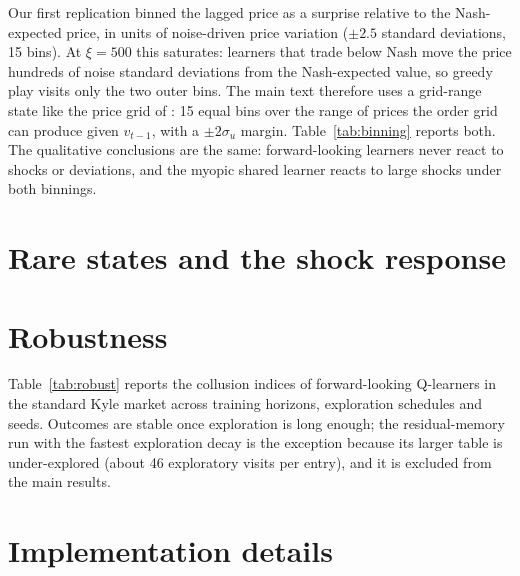 Our first replication binned the lagged price as a surprise relative to the
Nash-expected price, in units of noise-driven price variation ($\pm2.5$
standard deviations, 15 bins). At $\xi=500$ this saturates: learners that
trade below Nash move the price hundreds of noise standard deviations from the
Nash-expected value, so greedy play visits only the two outer bins. The main
text therefore uses a grid-range state like the price grid of \citet{dou2025}:
15 equal bins over the range of prices the order grid can produce given
$v_{t-1}$, with a $\pm2\sigma_u$ margin. Table~\ref{tab:binning} reports both.
The qualitative conclusions are the same: forward-looking learners never react
to shocks or deviations, and the myopic shared learner reacts to large shocks
under both binnings.

\begin{table}[h]
  \centering
  \small
  \resizebox{\linewidth}{!}{}
  \caption{$\xi=500$ results under the two price-state binnings. Shock
  response and rival reaction in \% of $\beta^N$; 95\% CIs.}
  \label{tab:binning}
\end{table}

\section{Rare states and the shock response}
\label{app:rare}


\section{Robustness}
\label{app:robust}

Table~\ref{tab:robust} reports the collusion indices of forward-looking
Q-learners in the standard Kyle market across training horizons, exploration
schedules and seeds. Outcomes are stable once exploration is long enough; the
residual-memory run with the fastest exploration decay is the exception
because its larger table is under-explored (about 46 exploratory visits per
entry), and it is excluded from the main results.

\begin{table}[h]
  \centering
  \small
  
  \caption{Robustness of the standard-Kyle outcomes. $\beta$ is the exploration
  decay ($\varepsilon_t=e^{-\beta t}$). 100--200 markets per row; 95\% CIs.}
  \label{tab:robust}
\end{table}

\section{Implementation details}
\label{app:impl}


